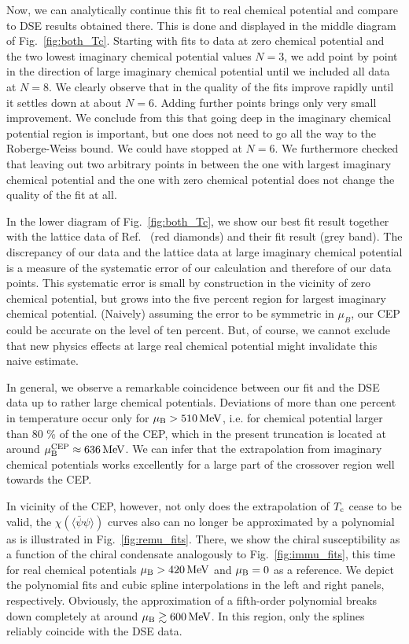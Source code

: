 \documentclass[%
    aps,
    prd,
    reprint,
    superscriptaddress,
    floatfix,
    nofootinbib,
    noamsmath,
    noamssymb
]{revtex4-2}
\newcommand*{\+}{\hspace*{.08335em}}
\newcommand*{\?}{\hspace*{-.08335em}}
\newcommand*{\Tc}{T_{\textup{c}}}
\newcommand*{\muB}{\mu_{\textup{B}}}
\newcommand*{\cond}{\langle \bar{\psi} \psi \rangle}
\begin{document}
Now, we can analytically continue this fit to real chemical potential and
compare to DSE results obtained there. This is done and displayed in the middle 
diagram of Fig.~\ref{fig:both_Tc}. Starting with fits to data at zero chemical potential
and the two lowest imaginary chemical potential values $N=3$, we add point by 
point 
in the direction of large imaginary chemical potential until we included all data at $N=8$.
We clearly observe that in the quality of the fits improve rapidly until it settles down 
at about $N=6$. Adding further points brings only very small improvement. We conclude
from this that going deep in the imaginary chemical potential region is important, but
one does not need to go all the way to the Roberge-Weiss bound. We could have stopped at
$N=6$. We furthermore checked that leaving out two arbitrary points in between 
the one
with largest imaginary chemical potential and the one with zero chemical potential does
not change the quality of the fit at all. 

In the lower diagram of Fig.~\ref{fig:both_Tc}, we show our best fit result 
together 
with the lattice data of Ref.~\cite{Borsanyi:2020fev} (red diamonds) and their fit result (grey band).
The discrepancy of our data and the lattice data at large imaginary chemical potential 
is a measure of the systematic error of our calculation and therefore of our data points.
This systematic error is small by construction in the vicinity of zero chemical potential,
but grows into the five percent region for largest imaginary chemical potential. (Naively) 
assuming the error to be symmetric in $\mu_B$, our CEP could be accurate on the level of 
ten percent. But, of course, we cannot exclude that new physics effects at large real chemical 
potential might invalidate this naive estimate. 

In general, we observe a remarkable coincidence between our fit and the DSE data up to rather large
chemical potentials. Deviations of more than one percent in temperature occur
only for $\muB > \SI{510}{\MeV}$, i.e. for chemical potential larger than 80 \%
of the one of the CEP, which in the present truncation is located at around
$\muB^{\textup{CEP}} \approx \SI{636}{\MeV}$.
We can infer that the extrapolation from imaginary chemical potentials works
excellently for a large part of the crossover region well towards the CEP.

In vicinity of the CEP, however, not only does the extrapolation of $\Tc$ cease
to be valid, the $\chi(\cond)$ curves also can no longer be approximated by a
polynomial as is illustrated in Fig.~\ref{fig:remu_fits}. There, we show the
chiral susceptibility as a function of the chiral condensate analogously to
Fig.~\ref{fig:immu_fits}, this time for real chemical potentials $\muB
>\SI{420}{\MeV}$ and $\muB = 0$ as a reference. We depict the polynomial fits
and cubic spline interpolations in the left and right panels, respectively.
Obviously, the approximation of a fifth-order polynomial breaks down completely
at around $\muB \gtrsim \SI{600}{\MeV}$. In this region, only the splines
reliably coincide with the DSE data.
\end{document}
